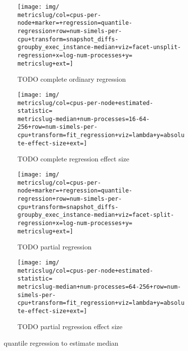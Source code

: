 \begin{figure*}
  \centering

  \begin{subfigure}[b]{0.5\textwidth}
    \centering
    \texttt{[image: img/\\metricslug/col=cpus-per-node+marker=+regression=quantile-regression+row=num-simels-per-cpu+transform=snapshot\_diffs-groupby\_exec\_instance-median+viz=facet-unsplit-regression+x=log-num-processes+y=\\metricslug+ext=]}
    \caption{TODO complete ordinary regression}
    \label{fig:regression-quantile-\metricslug-complete-regression}
  \end{subfigure}%
  \begin{subfigure}[b]{0.5\textwidth}
    \centering
    \texttt{[image: img/\\metricslug/col=cpus-per-node+estimated-statistic=\\metricslug-median+num-processes=16-64-256+row=num-simels-per-cpu+transform=fit\_regression+viz=lambda+y=absolute-effect-size+ext=]}
    \caption{TODO complete regression effect size}
    \label{fig:regression-quantile-\metricslug-complete-effect-size}
  \end{subfigure}

  \begin{subfigure}[b]{0.5\textwidth}
    \centering
    \texttt{[image: img/\\metricslug/col=cpus-per-node+marker=+regression=quantile-regression+row=num-simels-per-cpu+transform=snapshot\_diffs-groupby\_exec\_instance-median+viz=facet-split-regression+x=log-num-processes+y=\\metricslug+ext=]}
    \caption{TODO partial regression}
    \label{fig:regression-quantile-\metricslug-partial-regression}
  \end{subfigure}%
  \begin{subfigure}[b]{0.5\textwidth}
    \centering
    \texttt{[image: img/\\metricslug/col=cpus-per-node+estimated-statistic=\\metricslug-median+num-processes=64-256+row=num-simels-per-cpu+transform=fit\_regression+viz=lambda+y=absolute-effect-size+ext=]}
    \caption{TODO partial regression effect size}
    \label{fig:regression-quantile-\metricslug-partial-effect-size}
  \end{subfigure}
  \caption{\metricslug ~ quantile regression to estimate median}
  \label{fig:regression-quantile-\metricslug}
\end{figure*}
